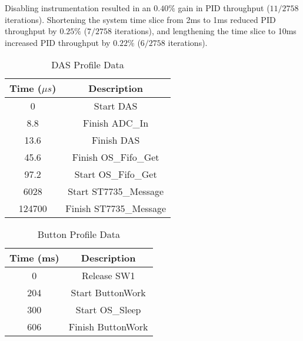 \documentclass{IEEEtran}
\begin{document}
Disabling instrumentation resulted in an $0.40\%$ gain in PID throughput ($11/2758$ iterations). Shortening the system time slice from 2ms to 1ms reduced PID throughput by  $0.25\%$ ($7/2758$ iterations), and lengthening the time slice to 10ms increased PID throughput by $0.22\%$ ($6/2758$ iterations).

\begin{table}[b]
  \centering
  \renewcommand{\arraystretch}{1.1}
  \caption{DAS Profile Data}
  \label{tbl:profile-das}
  \begin{tabular}{c|c}
    Time ($\mu s$) & Description\\
    \hline
    0 &  Start DAS\\
    8.8 & Finish ADC\_In\\
    13.6 & Finish DAS\\
    45.6 & Finish OS\_Fifo\_Get\\
    97.2 & Start OS\_Fifo\_Get\\
    6028 & Start ST7735\_Message\\
    124700 & Finish ST7735\_Message
  \end{tabular}
\end{table}

\begin{table}[b]
  \centering
  \renewcommand{\arraystretch}{1.1}
  \caption{Button Profile Data}
  \label{tbl:profile-button}
  \begin{tabular}{c|c}
    Time (ms) & Description\\
    \hline
    0 & Release SW1\\
    204 & Start ButtonWork\\
    300 & Start OS\_Sleep\\
    606 & Finish ButtonWork
  \end{tabular}
\end{table}
\end{document}
